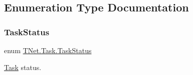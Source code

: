 \subsection{Enumeration Type Documentation}
\mbox{\label{namespace_t_net_1_1_task_a130950819ba1d2807bfb809104d1a462}} 
\subsubsection{\texorpdfstring{Task\+Status}{TaskStatus}}
{\footnotesize\ttfamily enum \mbox{\hyperlink{namespace_t_net_1_1_task_a130950819ba1d2807bfb809104d1a462}{T\+Net.\+Task.\+Task\+Status}}\hspace{0.3cm}{\ttfamily [strong]}}



\mbox{\hyperlink{namespace_t_net_1_1_task}{Task}} status. 

